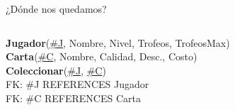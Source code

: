 \begin{frame}{¿D\'onde nos quedamos?}
\begin{columns}[T]
\begin{column}{0.48\linewidth}
\begin{scriptsize}
                    \textbf{Jugador}(\underline{\#J}, Nombre, Nivel, Trofeos, TrofeosMax)\\[2mm]
                    \textbf{Carta}(\underline{\#C}, Nombre, Calidad, Desc., Costo)\\[2mm]
                    \textbf{Coleccionar}(\underline{\#J}, \underline{\#C})\\[1mm]
                    \hspace{4mm} FK: \#J REFERENCES Jugador\\
                    \hspace{4mm} FK: \#C REFERENCES Carta

                \end{scriptsize}

        \end{column}
        
    \end{columns}

\end{frame}
